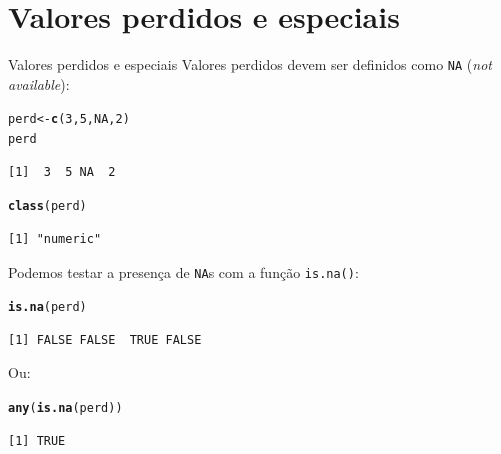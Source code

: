 \documentclass[10pt,handout]{beamer}\usepackage[]{graphicx}\usepackage[]{color}
\makeatletter
\newcommand{\hlnum}[1]{\textcolor[rgb]{0.686,0.059,0.569}{#1}}%
\newcommand{\hlstd}[1]{\textcolor[rgb]{0.345,0.345,0.345}{#1}}%
\newcommand{\hlkwb}[1]{\textcolor[rgb]{0.69,0.353,0.396}{#1}}%
\newcommand{\hlkwd}[1]{\textcolor[rgb]{0.737,0.353,0.396}{\textbf{#1}}}%
\newenvironment{kframe}{%
 \def\at@end@of@kframe{}%
 \ifinner\ifhmode%
  \def\at@end@of@kframe{\end{minipage}}%
  \begin{minipage}{\columnwidth}%
 \fi\fi%
 \def\FrameCommand##1{\hskip\@totalleftmargin \hskip-\fboxsep
 \colorbox{shadecolor}{##1}\hskip-\fboxsep
     \hskip-\linewidth \hskip-\@totalleftmargin \hskip\columnwidth}%
 \MakeFramed {\advance\hsize-\width
   \@totalleftmargin\z@ \linewidth\hsize
   \@setminipage}}%
 {\par\unskip\endMakeFramed%
 \at@end@of@kframe}
\newenvironment{knitrout}{}{} %
\makeatother
\begin{document}
\section[Valores perdidos]{Valores perdidos e especiais}

\begin{frame}[fragile]{Valores perdidos e especiais}
Valores perdidos devem ser definidos como \texttt{NA} (\textit{not available}):
\begin{knitrout}\small
{}\color{fgcolor}\begin{kframe}
\begin{alltt}
\hlstd{perd} \hlkwb{<-} \hlkwd{c}\hlstd{(}\hlnum{3}\hlstd{,} \hlnum{5}\hlstd{,} \hlnum{NA}\hlstd{,} \hlnum{2}\hlstd{)}
\hlstd{perd}
\end{alltt}
\begin{verbatim}
[1]  3  5 NA  2
\end{verbatim}
\begin{alltt}
\hlkwd{class}\hlstd{(perd)}
\end{alltt}
\begin{verbatim}
[1] "numeric"
\end{verbatim}
\end{kframe}
\end{knitrout}
Podemos testar a presença de \texttt{NA}s com a função \texttt{is.na()}:
\begin{knitrout}\small
{}\color{fgcolor}\begin{kframe}
\begin{alltt}
\hlkwd{is.na}\hlstd{(perd)}
\end{alltt}
\begin{verbatim}
[1] FALSE FALSE  TRUE FALSE
\end{verbatim}
\end{kframe}
\end{knitrout}
Ou:
\begin{knitrout}\small
{}\color{fgcolor}\begin{kframe}
\begin{alltt}
\hlkwd{any}\hlstd{(}\hlkwd{is.na}\hlstd{(perd))}
\end{alltt}
\begin{verbatim}
[1] TRUE
\end{verbatim}
\end{kframe}
\end{knitrout}
\end{frame}
\end{document}
